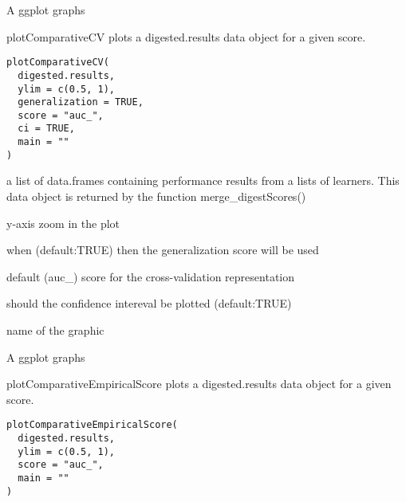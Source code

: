 \documentclass[a4paper]{book}
\begin{document}
%
\begin{Value}
A ggplot graphs
\end{Value}
%
\begin{Description}
plotComparativeCV plots a digested.results data object for a given score.
\end{Description}
%
\begin{Usage}
\begin{verbatim}
plotComparativeCV(
  digested.results,
  ylim = c(0.5, 1),
  generalization = TRUE,
  score = "auc_",
  ci = TRUE,
  main = ""
)
\end{verbatim}
\end{Usage}
%
\begin{Arguments}
\begin{ldescription}
\item[\code{digested.results:}] a list of data.frames containing performance results from a lists of learners. This data object is returned by the function merge\_digestScores()

\item[\code{ylim:}] y-axis zoom in the plot

\item[\code{generalization:}] when (default:TRUE) then the generalization score will be used

\item[\code{score:}] default (auc\_) score for the cross-validation representation

\item[\code{ci:}] should the confidence intereval be plotted (default:TRUE)

\item[\code{main:}] name of the graphic
\end{ldescription}
\end{Arguments}
%
\begin{Value}
A ggplot graphs
\end{Value}
%
\begin{Description}
plotComparativeEmpiricalScore plots a digested.results data object for a given score.
\end{Description}
%
\begin{Usage}
\begin{verbatim}
plotComparativeEmpiricalScore(
  digested.results,
  ylim = c(0.5, 1),
  score = "auc_",
  main = ""
)
\end{verbatim}
\end{Usage}
\end{document}
